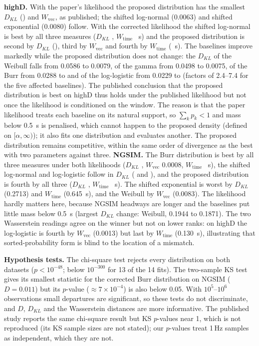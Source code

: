 \documentclass[10pt,a4paper]{article}
\numberwithin{equation}{section}
\newcommand{\Wvec}{W_{\mathrm{vec}}}
\newcommand{\Wtime}{W_{\mathrm{time}}}
\begin{document}
\textbf{highD.} With the paper's likelihood the proposed distribution has the smallest $D_{KL}$ (\hdKLPropPaper) and $\Wvec$, as published; the shifted log-normal (0.0063) and shifted exponential (0.0080) follow. With the corrected likelihood the shifted log-normal is best by all three measures ($D_{KL}$ \hdKLSLN, $\Wtime$ \hdWtimeBestVal~s) and the proposed distribution is second by $D_{KL}$ (\hdKLProp), third by $\Wvec$ and fourth by $\Wtime$ (\hdWtimeProp~s).
The baselines improve markedly while the proposed distribution does not change: the $D_{KL}$ of the Weibull falls from 0.0586 to 0.0079, of the gamma from 0.0498 to 0.0075, of the Burr from 0.0288 to \hdKLBurr{} and of the log-logistic from 0.0229 to \hdKLLLog{} (factors of 2.4--7.4 for the five affected baselines). The published conclusion that the proposed distribution is best on highD thus holds under the published likelihood but not once the likelihood is conditioned on the window.
The reason is that the paper likelihood treats each baseline on its natural support, so $\sum_kp_k<1$ and mass below 0.5~s is penalised, which cannot happen to the proposed density (defined on $[\alpha,\infty)$); it also fits one distribution and evaluates another. The proposed distribution remains competitive, within the same order of divergence as the best with two parameters against three.
\textbf{NGSIM.} The Burr distribution is best by all three measures under both likelihoods ($D_{KL}$ \ngKLBurr, $\Wvec$ 0.0008, $\Wtime$ \ngWtimeBestVal~s), the shifted log-normal and log-logistic follow in $D_{KL}$ (\ngKLSLN{} and \ngKLLLog), and the proposed distribution is fourth by all three ($D_{KL}$ \ngKLProp, $\Wtime$ \ngWtimeProp~s). The shifted exponential is worst by $D_{KL}$ (0.2713) and $\Wtime$ (0.645~s), and the Weibull by $\Wvec$ (0.0083).
The likelihood hardly matters here, because NGSIM headways are longer and the baselines put little mass below 0.5~s (largest $D_{KL}$ change: Weibull, 0.1944 to 0.1871).
The two Wasserstein readings agree on the winner but not on lower ranks: on highD the log-logistic is fourth by $\Wvec$ (0.0013) but last by $\Wtime$ (0.130~s), illustrating that sorted-probability form is blind to the location of a mismatch.

\textbf{Hypothesis tests.} The chi-square test rejects every distribution on both datasets ($p<10^{-48}$; below $10^{-300}$ for 13 of the 14 fits). The two-sample KS test gives its smallest statistic for the corrected Burr distribution on NGSIM ($D=0.011$) but its $p$-value ($\approx7\times10^{-4}$) is also below 0.05.
With $10^5$--$10^6$ observations small departures are significant, so these tests do not discriminate, and $D$, $D_{KL}$ and the Wasserstein distances are more informative. The published study reports the same chi-square result but KS $p$-values near 1, which is not reproduced (its KS sample sizes are not stated); our $p$-values treat 1\,Hz samples as independent, which they are not.
\end{document}
